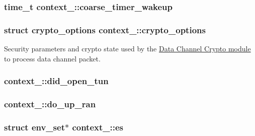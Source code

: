 \subsubsection[{coarse\+\_\+timer\+\_\+wakeup}]{\setlength{\rightskip}{0pt plus 5cm}time\+\_\+t context\+\_\+::coarse\+\_\+timer\+\_\+wakeup}\label{structcontext__2_a7a1136ef8707e675d479855614eadb10}
\hypertarget{structcontext__2_a901a1a0ceb94dbd3e9f758552fa4fbd9}{}
\subsubsection[{crypto\+\_\+options}]{\setlength{\rightskip}{0pt plus 5cm}struct {\bf crypto\+\_\+options} context\+\_\+::crypto\+\_\+options}\label{structcontext__2_a901a1a0ceb94dbd3e9f758552fa4fbd9}
Security parameters and crypto state used by the \hyperlink{group__data__crypto}{Data Channel Crypto module} to process data channel packet. \hypertarget{structcontext__2_a367a0c4601050fe0e0368ec06c58754b}{}
\subsubsection[{did\+\_\+open\+\_\+tun}]{ context\+\_\+::did\+\_\+open\+\_\+tun}\label{structcontext__2_a367a0c4601050fe0e0368ec06c58754b}
\hypertarget{structcontext__2_a267d253d04cc5ef2d91efd6ce4a8f28a}{}
\subsubsection[{do\+\_\+up\+\_\+ran}]{ context\+\_\+::do\+\_\+up\+\_\+ran}\label{structcontext__2_a267d253d04cc5ef2d91efd6ce4a8f28a}
\hypertarget{structcontext__2_a59b42a3c7d754a42ba10acf3c035a1c2}{}
\subsubsection[{es}]{\setlength{\rightskip}{0pt plus 5cm}struct {\bf env\+\_\+set}$\ast$ context\+\_\+::es}\label{structcontext__2_a59b42a3c7d754a42ba10acf3c035a1c2}
\hypertarget{structcontext__2_a43f0201867a96a35bbecb2e52e880e47}{}

